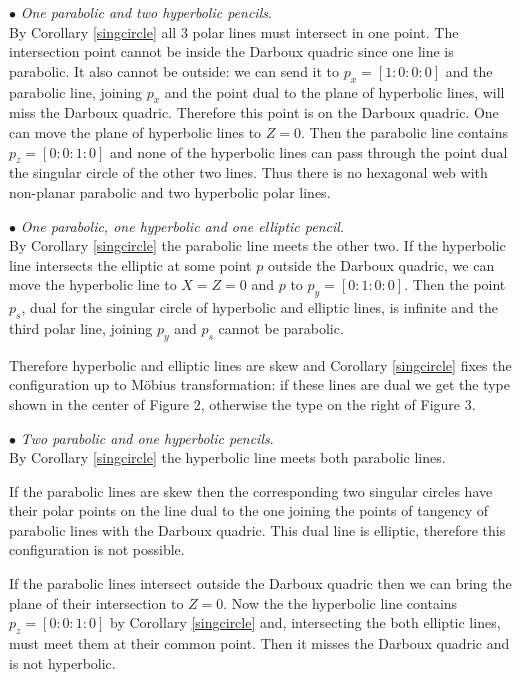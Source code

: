 \documentclass[11pt,a4paper]{article}
\begin{document}
{$\bullet$ \it One parabolic and two hyperbolic pencils}.\\
By Corollary \ref{singcircle} all 3 polar lines must intersect in one point. The  intersection point cannot be inside the Darboux quadric since one line is parabolic. It also cannot be outside:  we can send it to $p_x=[1:0:0:0]$ and the parabolic line, joining $p_x$ and the point dual to the plane of hyperbolic lines, will miss the Darboux quadric. Therefore this point is on the Darboux quadric. One can move the plane of hyperbolic lines to $Z=0$. Then the parabolic line contains $p_z=[0:0:1:0]$ and none of the hyperbolic lines can pass through the point dual the singular circle of the other two lines.  Thus there is no hexagonal web with non-planar  parabolic and two hyperbolic polar lines. 



  


$\bullet${ \it One parabolic, one hyperbolic and one elliptic pencil}.\\
By Corollary \ref{singcircle}  the parabolic line meets the other two. 
If the hyperbolic line intersects the elliptic at some point $p$ outside the Darboux quadric, we can move the hyperbolic line to $X=Z=0$ and $p$ to $p_y=[0:1:0:0]$. Then the point $p_s$, dual for the  singular circle of hyperbolic and elliptic lines, is infinite and the third polar line, joining $p_y$ and $p_s$ cannot be parabolic. 

Therefore hyperbolic and elliptic lines are skew and Corollary \ref{singcircle} fixes the configuration up to M\"obius transformation: if these lines are dual we get the type shown in the center of Figure 2, otherwise the type on the right of Figure 3.



$\bullet${ \it Two parabolic and one hyperbolic pencils}.\\
By Corollary \ref{singcircle}  the hyperbolic line meets both parabolic lines. 

If the parabolic lines are skew then the corresponding two singular circles have their polar points on the line dual to the one joining the points of tangency of parabolic lines with the Darboux quadric. This dual line is elliptic, therefore this configuration is not possible. 

If the parabolic lines intersect outside the Darboux quadric then we can bring the plane of their intersection to $Z=0$. Now the the hyperbolic line contains $p_z=[0:0:1:0]$ by Corollary \ref{singcircle} and, intersecting the both elliptic lines, must meet them at their common point. Then it misses the Darboux quadric and is not hyperbolic. 
\end{document}
